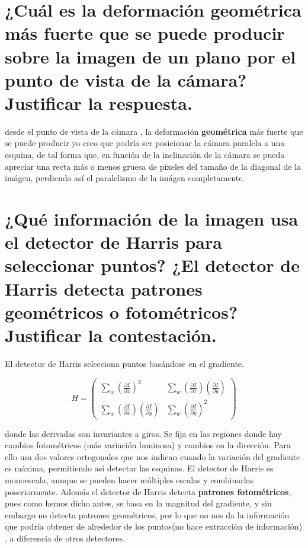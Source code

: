 \section{¿Cuál es la deformación geométrica más fuerte que se puede producir sobre
la imagen de un plano por el punto de vista de la cámara? Justificar la respuesta.}
desde el punto de vista de la cámara , la deformación \textbf{geométrica} más fuerte que se
puede producir yo creo que podría ser posicionar la cámara paralela a una esquina, de tal forma que, en función de la inclinación
de la cámara se pueda apreciar una recta más o menos gruesa de píxeles del tamaño de la diagonal de la imágen, perdiendo así
el paralelismo de la imágen completamente.

\section{¿Qué información de la imagen usa el detector de Harris para seleccionar
puntos? ¿El detector de Harris detecta patrones geométricos o fotométricos?
Justificar la contestación.}
El detector de Harris selecciona puntos basándose en el gradiente.

\[H=\begin{pmatrix} \sum_{w}(\frac{\partial I}{\partial x})^{2} & \sum_{w}(\frac{\partial I}{\partial x})(\frac{\partial I}{\partial y}) \\ \sum_{w}(\frac{\partial I}{\partial x})(\frac{\partial I}{\partial y})& \sum_{w}(\frac{\partial I}{\partial y})^{2} \end{pmatrix}\]

donde las derivadas son invariantes a giros.
Se fija en las regiones donde
hay cambios fotométricos (más variación luminosa) y cambios en la dirección. Para ello
usa dos valores ortogonales que nos indican cuando la variación del gradiente es máxima, permitiendo así detectar las esquinas.
\newline
El detector de Harris es monoescala, aunque se pueden hacer múltiples escalas y combinarlas poseriormente. \newline Además
el detector de Harris detecta \textbf{patrones fotométricos}, pues como hemos dicho antes, se basa en la magnitud del gradiente, y sin
embargo no detecta patrones geométricos, por lo que no nos da la información que podría obtener de alrededor de los puntos(no hace extracción de información)
, a diferencia
de otros detectores.


